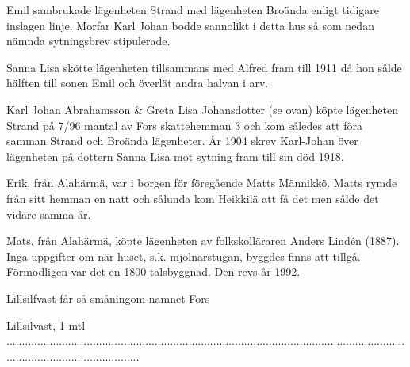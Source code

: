 Emil sambrukade lägenheten Strand med lägenheten Broända enligt tidigare inslagen linje. Morfar Karl Johan bodde sannolikt i detta hus så som nedan nämnda sytningsbrev stipulerade.



Sanna Lisa skötte lägenheten tillsammans med Alfred fram till 1911 	då hon sålde hälften till sonen Emil och överlät andra halvan i arv.



Karl Johan Abrahamsson \& Greta Lisa Johansdotter (se ovan) köpte lägenheten Strand på 7/96 mantal av Fors skattehemman 3 och kom således att föra samman Strand och Broända lägenheter. År 1904 skrev Karl-Johan över lägenheten på dottern Sanna Lisa mot sytning fram till sin död 1918.



Erik, från Alahärmä, var i borgen för föregående Matts Männikkö. Matts rymde från sitt hemman en natt och sålunda kom Heikkilä att få det men sålde det vidare samma år.



Mats, från Alahärmä, köpte lägenheten av folkskolläraren Anders Lindén (1887). Inga uppgifter om när huset, s.k. mjölnarstugan, byggdes finns att tillgå. Förmodligen var det en 1800-talsbyggnad. Den revs år 1992.








 Lillsilfvast får så småningom namnet Fors





Lillsilvast, 1 mtl
............................................................................................................................................................................
